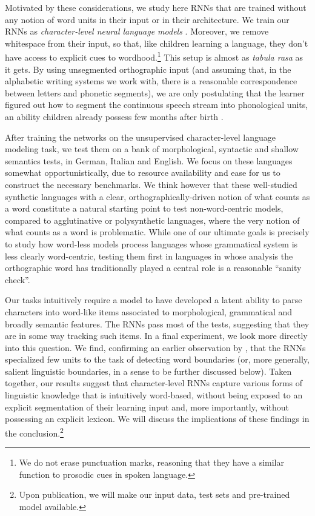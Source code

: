 Motivated by these considerations, we study here RNNs that are trained
without any notion of word units in their input or in their
architecture. We train our RNNs as \emph{character-level
  neural language models}
\cite[CNLMs,][]{Mikolov:etal:2011,Sutskever:etal:2011,DBLP:journals/corr/Graves13}. Moreover,
we remove whitespace from their input, so that, like children learning
a language, they don't have access to explicit cues to
wordhood.\footnote{We do not erase punctuation marks, reasoning that
  they have a similar function to prosodic cues in spoken language.}
This setup is almost as \emph{tabula rasa} as it gets. By using
unsegmented orthographic input (and assuming that, in the alphabetic
writing systems we work with, there is a reasonable correspondence
between letters and phonetic segments), we are only postulating that
the learner figured out how to segment the continuous speech stream
into phonological units, an ability children already possess few
months after birth
\cite[e.g.,][]{Maye:etal:2002,Kuhl:2004}.

After training the networks on the unsupervised character-level
language modeling task, we test them on a bank of morphological,
syntactic and shallow semantics tests, in German, Italian and
English. We focus on these languages somewhat
opportunistically, due to resource availability and ease for us to
construct the necessary benchmarks. We think however that these
well-studied synthetic languages with a clear, orthographically-driven
notion of what counts as a word constitute a natural starting point to
test non-word-centric models, compared to agglutinative or
polysynthetic languages, where the very notion of what counts as a
word is problematic. While one of our ultimate goals is precisely to
study how word-less models process languages whose grammatical system
is less clearly word-centric, testing them first in languages in whose
analysis the orthographic word has traditionally played a central role
is a reasonable ``sanity check''.
  
Our tasks intuitively require a model to have developed a latent
ability to parse characters into word-like items associated to
morphological, grammatical and broadly semantic features. The RNNs
pass most of the tests, suggesting that they are in some way tracking
such items. In a final experiment, we look more directly into this
question. We find, confirming an earlier observation by
, that the RNNs specialized few
units to the task of detecting word boundaries (or, more
generally, salient linguistic boundaries, in a sense to be further
discussed below). Taken together, our results suggest that
character-level RNNs capture various forms of linguistic knowledge
that is intuitively word-based, without being exposed to an explicit
segmentation of their learning input and, more importantly, without
possessing an explicit lexicon. We will discuss the implications of
these findings in the conclusion.\footnote{Upon publication, we will
  make our input data, test sets and pre-trained model available.}

